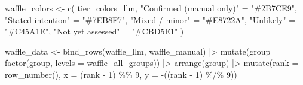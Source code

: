 \documentclass[
  11pt,
  letterpaper,
]{article}
\newenvironment{Shaded}{\begin{snugshade}}{\end{snugshade}}
\newcommand{\AttributeTok}[1]{\textcolor[rgb]{0.40,0.45,0.13}{#1}}
\newcommand{\DecValTok}[1]{\textcolor[rgb]{0.68,0.00,0.00}{#1}}
\newcommand{\FunctionTok}[1]{\textcolor[rgb]{0.28,0.35,0.67}{#1}}
\newcommand{\NormalTok}[1]{\textcolor[rgb]{0.00,0.23,0.31}{#1}}
\newcommand{\OtherTok}[1]{\textcolor[rgb]{0.00,0.23,0.31}{#1}}
\newcommand{\SpecialCharTok}[1]{\textcolor[rgb]{0.37,0.37,0.37}{#1}}
\newcommand{\StringTok}[1]{\textcolor[rgb]{0.13,0.47,0.30}{#1}}
\begin{document}
\begin{Shaded}
\begin{Highlighting}[]
\NormalTok{  waffle\_colors }\OtherTok{\textless{}{-}} \FunctionTok{c}\NormalTok{(}
\NormalTok{    tier\_colors\_llm,}
    \StringTok{"Confirmed (manual only)"} \OtherTok{=} \StringTok{"\#2B7CE9"}\NormalTok{,}
    \StringTok{"Stated intention"}        \OtherTok{=} \StringTok{"\#7EB8F7"}\NormalTok{,}
    \StringTok{"Mixed / minor"}           \OtherTok{=} \StringTok{"\#E8722A"}\NormalTok{,}
    \StringTok{"Unlikely"}                \OtherTok{=} \StringTok{"\#C45A1E"}\NormalTok{,}
    \StringTok{"Not yet assessed"}        \OtherTok{=} \StringTok{"\#CBD5E1"}
\NormalTok{  )}

\NormalTok{  waffle\_data }\OtherTok{\textless{}{-}} \FunctionTok{bind\_rows}\NormalTok{(waffle\_llm, waffle\_manual) }\SpecialCharTok{|\textgreater{}}
    \FunctionTok{mutate}\NormalTok{(}\AttributeTok{group =} \FunctionTok{factor}\NormalTok{(group, }\AttributeTok{levels =}\NormalTok{ waffle\_all\_groups)) }\SpecialCharTok{|\textgreater{}}
    \FunctionTok{arrange}\NormalTok{(group) }\SpecialCharTok{|\textgreater{}}
    \FunctionTok{mutate}\NormalTok{(}\AttributeTok{rank =} \FunctionTok{row\_number}\NormalTok{(),}
           \AttributeTok{x =}\NormalTok{ (rank }\SpecialCharTok{{-}} \DecValTok{1}\NormalTok{) }\SpecialCharTok{\%\%} \DecValTok{9}\NormalTok{,}
           \AttributeTok{y =} \SpecialCharTok{{-}}\NormalTok{((rank }\SpecialCharTok{{-}} \DecValTok{1}\NormalTok{) }\SpecialCharTok{\%/\%} \DecValTok{9}\NormalTok{))}


\end{Highlighting}
\end{Shaded}
\end{document}

